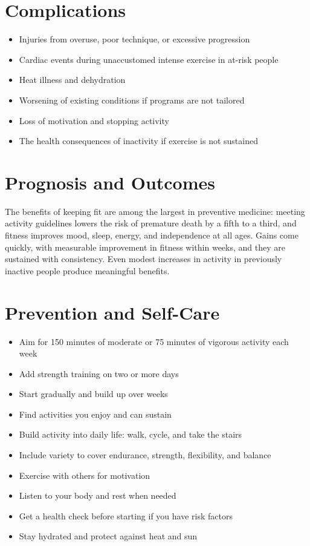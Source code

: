 \section*{Complications}
\begin{itemize}
    \item Injuries from overuse, poor technique, or excessive progression
    \item Cardiac events during unaccustomed intense exercise in at-risk people
    \item Heat illness and dehydration
    \item Worsening of existing conditions if programs are not tailored
    \item Loss of motivation and stopping activity
    \item The health consequences of inactivity if exercise is not sustained
\end{itemize}

\section*{Prognosis and Outcomes}
The benefits of keeping fit are among the largest in preventive medicine: meeting activity guidelines lowers the risk of premature death by a fifth to a third, and fitness improves mood, sleep, energy, and independence at all ages. Gains come quickly, with measurable improvement in fitness within weeks, and they are sustained with consistency. Even modest increases in activity in previously inactive people produce meaningful benefits.

\section*{Prevention and Self-Care}
\begin{itemize}
    \item Aim for 150 minutes of moderate or 75 minutes of vigorous activity each week
    \item Add strength training on two or more days
    \item Start gradually and build up over weeks
    \item Find activities you enjoy and can sustain
    \item Build activity into daily life: walk, cycle, and take the stairs
    \item Include variety to cover endurance, strength, flexibility, and balance
    \item Exercise with others for motivation
    \item Listen to your body and rest when needed
    \item Get a health check before starting if you have risk factors
    \item Stay hydrated and protect against heat and sun
\end{itemize}

